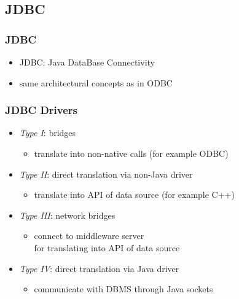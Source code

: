 \documentclass[dvipsnames]{beamer}
\theoremstyle{plain}
\begin{document}
\subsection{JDBC}

\lstset{language=Java}

\begin{frame}
  \frametitle{JDBC}

  \begin{itemize}
    \item \alert{JDBC}: Java DataBase Connectivity

    \medskip
    \item same architectural concepts as in ODBC
  \end{itemize}
\end{frame}

\begin{frame}
  \frametitle{JDBC Drivers}

  \begin{itemize}
    \item \emph{Type I}: bridges
    \begin{itemize}
      \item translate into non-native calls (for example ODBC)
    \end{itemize}

    \pause
    \medskip
    \item \emph{Type II}: direct translation via non-Java driver
    \begin{itemize}
      \item translate into API of data source (for example C++)
    \end{itemize}

    \pause
    \medskip
    \item \emph{Type III}: network bridges
    \begin{itemize}
      \item connect to middleware server\\
	for translating into API of data source
    \end{itemize}

    \pause
    \medskip
    \item \emph{Type IV}: direct translation via Java driver
    \begin{itemize}
      \item communicate with DBMS through Java sockets
    \end{itemize}
  \end{itemize}
\end{frame}
\end{document}
